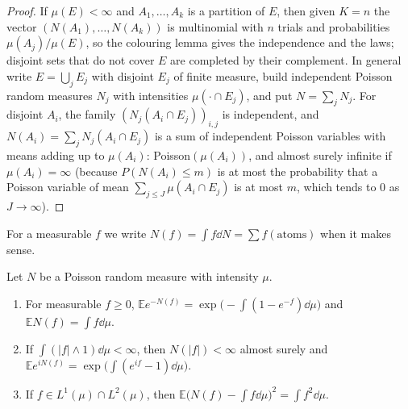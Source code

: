 \begin{proof}
If $\mu(E)<\infty$ and $A_1,\dots,A_k$ is a partition of $E$, then given $K=n$ the vector $(N(A_1),\dots,N(A_k))$ is multinomial with $n$ trials and probabilities $\mu(A_j)/\mu(E)$, so the colouring lemma gives the independence and the laws; disjoint sets that do
not cover $E$ are completed by their complement. In general write $E=\bigcup_jE_j$ with disjoint $E_j$ of finite measure, build independent Poisson random measures $N_j$ with intensities $\mu(\cdot\cap E_j)$, and
put $N=\sum_jN_j$. For disjoint $A_i$, the family $(N_j(A_i\cap E_j))_{i,j}$ is independent, and $N(A_i)=\sum_jN_j(A_i\cap E_j)$ is a sum of independent Poisson variables with means adding up to $\mu(A_i)$:
Poisson$(\mu(A_i))$, and almost surely infinite if $\mu(A_i)=\infty$ (because $P(N(A_i)\le m)$ is at most the probability that a Poisson variable of mean $\sum_{j\le J}\mu(A_i\cap E_j)$ is at most $m$, which tends to $0$ as $J\to\infty$).
\end{proof}

For a measurable $f$ we write $N(f)=\int f\dd N=\sum f(\text{atoms})$ when it makes sense.

\begin{proposition}\label{prop:campbell}
Let $N$ be a Poisson random measure with intensity $\mu$.
\begin{enumerate}[label=(\alph*)]
\item For measurable $f\ge0$, $\mathbb Ee^{-N(f)}=\exp\bigl(-\int(1-e^{-f})\dd\mu\bigr)$ and $\mathbb EN(f)=\int f\dd\mu$.
\item If $\int(|f|\wedge1)\dd\mu<\infty$, then $N(|f|)<\infty$ almost surely and $\mathbb Ee^{iN(f)}=\exp\bigl(\int(e^{if}-1)\dd\mu\bigr)$.
\item If $f\in L^1(\mu)\cap L^2(\mu)$, then $\mathbb E\bigl(N(f)-\int f\dd\mu\bigr)^2=\int f^2\dd\mu$.
\end{enumerate}
\end{proposition}

